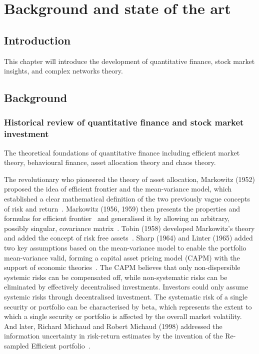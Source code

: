 \chapter[Background]{Background and state of the art}
\label{cpt:back}

\section{Introduction}
This chapter will introduce the development of quantitative finance, stock market insights, and complex networks theory.

\section{Background}
\subsection{Historical review of quantitative finance and stock market investment}
The theoretical foundations of quantitative finance including efficient market theory, behavioural finance, asset allocation theory and chaos theory.

The revolutionary who pioneered the theory of asset allocation, Markowitz (1952) proposed the idea of efficient frontier and the mean-variance model, which established a clear mathematical definition of the two previously vague concepts of risk and return~\cite{portfolio}. Markowitz (1956, 1959) then presents the properties and formulas for efficient frontier~\cite{markowitz1956optimization} and generalised it by allowing an arbitrary, possibly singular, covariance matrix~\cite{markowitz1959portfolio}. Tobin (1958) developed Markowitz's theory and added the concept of risk free assets~\cite{tobin1958liquidity}. Sharp (1964) and Linter (1965) added two key assumptions based on the mean-variance model to enable the portfolio mean-variance valid, forming a capital asset pricing model (CAPM) with the support of economic theories~\cite{equilibrium, diversification}. The CAPM believes that only non-dispersible systemic risks can be compensated off, while non-systematic risks can be eliminated by effectively decentralised investments. Investors could only assume systemic risks through decentralised investment. The systematic risk of a single security or portfolio can be characterised by beta, which represents the extent to which a single security or portfolio is affected by the overall market volatility. And later, Richard Michaud and Robert Michaud (1998) addressed the information uncertainty in risk-return estimates by the invention of the Re-sampled Efficient portfolio~\cite{michaud1998asset}.

